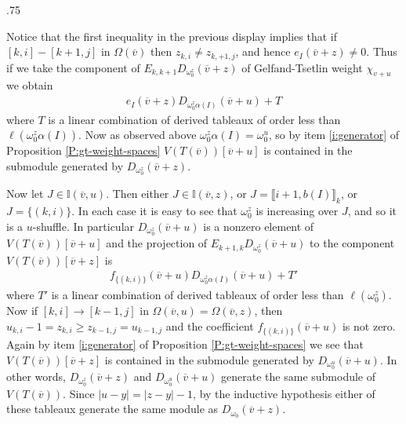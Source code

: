 \documentclass[11pt,fleqn]{amsart}
\makeatletter
\renewcommand\proofname{Proof}
\renewenvironment{proof}[1][\textit{\proofname}]{\par
 \pushQED{\qed}%
 \normalfont \topsep.75\paraskip\relax
 \trivlist
 \item[\hskip\labelsep
 \itshape
 #1\@addpunct{.}]\ignorespaces
}{%
 \popQED\endtrivlist\@endpefalse
}
\newcounter{para}[section]
\newcommand\vv{\overline{v}}
\newcommand\II{\mathbb I}
\newcommand\interval[1]{\llbracket #1 \rrbracket}
\makeatother
\begin{document}
\begin{proof}
Notice that the first inequality in the previous display implies that if 
$[k,i] - [k+1,j]$ in $\Omega(\vv)$ then $z_{k,i} \neq z_{k,+1,j}$, and hence 
$e_I(\vv+z) \neq 0$. Thus if we take the component of $E_{k,k+1} 
D_{\omega_0^z}(\vv + z)$ of Gelfand-Tsetlin weight $\chi_{v+u}$ we obtain
\begin{align*}
e_{I}(\vv + z) D_{\omega_0^z \alpha(I)}(\vv + u) + T
\end{align*}
where $T$ is a linear combination of derived tableaux of order less than 
$\ell(\omega_0^z \alpha(I))$. Now as observed above $\omega_0^z \alpha(I) = 
\omega_0^u$, so by item \ref{i:generator} of Proposition 
\ref{P:gt-weight-spaces} $V(T(\vv))[\vv + u]$ is contained in the submodule
generated by $D_{\omega_0^z}(\vv + z)$. 

Now let $J \in \II(\vv, u)$. Then either $J \in \II(\vv, z)$, or $J = 
\interval{i+1,b(I)}_k$, or $J = \{(k,i)\}$. In each case it is easy to see 
that $\omega_0^z$ is increasing over $J$, and so it is a $u$-shuffle. In 
particular $D_{\omega_0^z}(\vv + u)$ is a nonzero element of $V(T(\vv))[\vv + 
u]$ and the projection of $E_{k+1,k} D_{\omega_0^z}(\vv + u)$ to the component
$V(T(\vv))[\vv + z]$ is
\begin{align*}
f_{\{(k,i)\}}(\vv + u) D_{\omega_0^z \alpha(I)}(\vv + u) + T'
\end{align*}
where $T'$ is a linear combination of derived tableaux of order less than 
$\ell(\omega_0^z)$. Now if $[k,i] \rightarrow [k-1,j]$ in $\Omega(\vv,u) = 
\Omega(\vv,z)$, then $u_{k,i} - 1 = z_{k,i} \geq z_{k-1,j} = u_{k-1,j}$ and 
the coefficient $f_{\{(k,i)\}}(\vv + u)$ is not zero. Again by item 
\ref{i:generator} of Proposition \ref{P:gt-weight-spaces} we see that 
$V(T(\vv))[\vv + z]$ is contained in the submodule generated by 
$D_{\omega_0^u}(\vv + u)$. In other words, $D_{\omega_0^z}(\vv + z)$ and 
$D_{\omega_0^u}(\vv + u)$ generate the same submodule of $V(T(\vv))$. Since
$|u-y| = |z-y| - 1$, by the inductive hypothesis either of these tableaux 
generate the same module as $D_{\omega_0}(\vv + z)$.
\end{proof}

\begin{bibdiv}
\begin{biblist}
\end{biblist}
\end{bibdiv}
\end{document}
